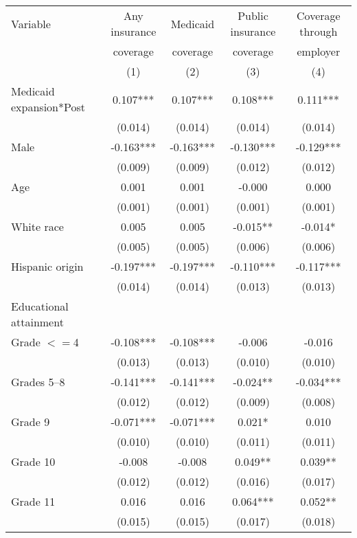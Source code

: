 \begin{tabular}{lcccc}
\toprule
\toprule
 Variable & Any insurance & Medicaid & Public insurance & Coverage through \\
  & coverage & coverage & coverage &  employer \\
  & (1) & (2) & (3) &  (4) \\
\midrule 
 Medicaid expansion*Post   & 0.107***   & 0.107***   & 0.108***   & 0.111***  \\
 & (0.014)   & (0.014)   & (0.014)   & (0.014)  \\
 Male   & -0.163***   & -0.163***   & -0.130***   & -0.129***  \\
 & (0.009)   & (0.009)   & (0.012)   & (0.012)  \\
 Age   & 0.001   & 0.001   & -0.000   & 0.000  \\
 & (0.001)   & (0.001)   & (0.001)   & (0.001)  \\
 White race   & 0.005   & 0.005   & -0.015**   & -0.014*  \\
 & (0.005)   & (0.005)   & (0.006)   & (0.006)  \\
 Hispanic origin   & -0.197***   & -0.197***   & -0.110***   & -0.117***  \\
 & (0.014)   & (0.014)   & (0.013)   & (0.013)  \\
 Educational attainment  \\
 \hspace{0.3cm} Grade $<=$4   & -0.108***   & -0.108***   & -0.006   & -0.016  \\
 & (0.013)   & (0.013)   & (0.010)   & (0.010)  \\
 \hspace{0.3cm}  Grades 5--8   & -0.141***   & -0.141***   & -0.024**   & -0.034***  \\
 & (0.012)   & (0.012)   & (0.009)   & (0.008)  \\
 \hspace{0.3cm} Grade 9   & -0.071***   & -0.071***   & 0.021*   & 0.010  \\
 & (0.010)   & (0.010)   & (0.011)   & (0.011)  \\
 \hspace{0.3cm} Grade 10   & -0.008   & -0.008   & 0.049**   & 0.039**  \\
 & (0.012)   & (0.012)   & (0.016)   & (0.017)  \\
 \hspace{0.3cm} Grade 11   & 0.016   & 0.016   & 0.064***   & 0.052**  \\
 & (0.015)   & (0.015)   & (0.017)   & (0.018)  \\

\end{tabular}
